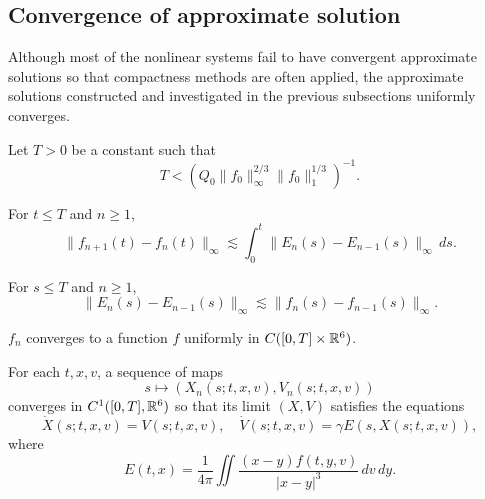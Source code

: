\documentclass{article}
\begin{document}
\subsection{Convergence of approximate solution}
Although most of the nonlinear systems fail to have convergent approximate solutions so that compactness methods are often applied, the approximate solutions constructed and investigated in the previous subsections uniformly converges.
\begin{lem}
Let $T>0$ be a constant such that
\[T<(Q_0\|f_0\|_\infty^{2/3}\|f_0\|_1^{1/3})^{-1}.\]
\begin{parts}
\item
For $t\le T$ and $n\ge1$,
\[\|f_{n+1}(t)-f_n(t)\|_\infty\lesssim\int_0^t\|E_n(s)-E_{n-1}(s)\|_\infty\,ds.\]
\item
For $s\le T$ and $n\ge1$,
\[\|E_n(s)-E_{n-1}(s)\|_\infty\lesssim\|f_n(s)-f_{n-1}(s)\|_\infty.\]
\item $f_n$ converges to a function $f$ uniformly in $C([0,T]\times\mathbb{R}^6)$.
\item For each $t,x,v$, a sequence of maps
\[s\mapsto(X_n(s;t,x,v),V_n(s;t,x,v))\]
converges in $C^1([0,T],\mathbb{R}^6)$ so that its limit $(X,V)$ satisfies the equations
\[\dot X(s;t,x,v)=V(s;t,x,v),\quad\dot V(s;t,x,v)=\gamma E(s,X(s;t,x,v)),\]
where
\[E(t,x)=\frac1{4\pi}\iint\frac{(x-y)f(t,y,v)}{|x-y|^3}\,dv\,dy.\]
\end{parts}
\end{lem}
\end{document}
